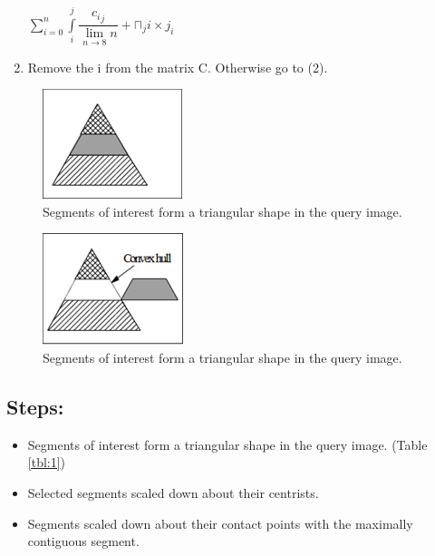 \documentclass{volcanica-template}
\begin{document}
\begin{enumerate}
\begin{center}
        $\sum\limits_{i=0}^n \int\limits_i^j \dfrac{{c_i}_j}{\lim\limits_{n \to 8}n} + \sqcap{_j}i \times j_i
    $
    \end{center} 
    \item Remove the i from the matrix C.  Otherwise go to (2).
\end{enumerate}
\begin{figure}
    \begin{center}
    \centering
    \includegraphics{1.png}
    \caption{Segments of interest form a triangular shape in the query image.}
    \label{fig:1}
    \end{center}
\end{figure}

\begin{figure}
    \begin{center}
    \centering
    \includegraphics{2.png}
    \caption{Segments of interest form a triangular shape in the query image.}
    \label{fig:2}
    \end{center}
\end{figure}



\subsection*{Steps:}
\begin{itemize}
    \item 	Segments of interest form a triangular shape in the query image. (Table \ref{tbl:1})
    \item 	Selected segments scaled down about their centrists.
    \item 	Segments scaled down about their contact points with the maximally contiguous segment.
\end{itemize}
\end{document}
